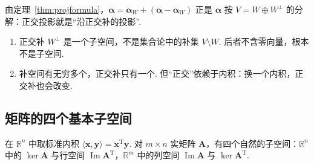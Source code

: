 \documentclass[lang=cn,10.5pt,scheme=chinese,toc=twocol,section,chinesefont=nofont,
twoside,citestyle=gb7714-2015,bibstyle=gb7714-2015]{elegantbook}
\DeclareRobustCommand{\textbf}[1]{{\lnsemiboldlatin\lnsemiboldcjk #1}}
\newcommand{\vv}[1]{\boldsymbol{#1}}
\newcommand{\trans}{\mathrm{T}}             %
\numberwithin{equation}{section}   %
\newcommand{\imm}{\operatorname{Im}}        %
\begin{document}
由定理~\ref{thm:projformula}，$\vv\alpha=\vv\alpha_W+(\vv\alpha-\vv\alpha_W)$ 正是 $\vv\alpha$ 按 $V=W\oplus W^\perp$ 的分解：正交投影就是“沿正交补的投影”.

\begin{pitfallbox}
  \begin{enumerate}
    \item 正交补 $W^\perp$ 是一个子空间，\textbf{不是}集合论中的补集 $V\setminus W$. 后者不含零向量，根本不是子空间.
    \item 补空间有无穷多个，正交补只有一个. 但“正交”依赖于内积：换一个内积，正交补也会改变.
  \end{enumerate}
\end{pitfallbox}

\subsection{矩阵的四个基本子空间}

在 $\mathbb{R}^n$ 中取标准内积 $\langle\vv x,\vv y\rangle=\vv x^\trans\vv y$. 对 $m\times n$ 实矩阵 $\vv A$，有四个自然的子空间：$\mathbb{R}^n$ 中的 $\ker\vv A$ 与行空间 $\imm\vv A^\trans$，$\mathbb{R}^m$ 中的列空间 $\imm\vv A$ 与 $\ker\vv A^\trans$.
\end{document}
